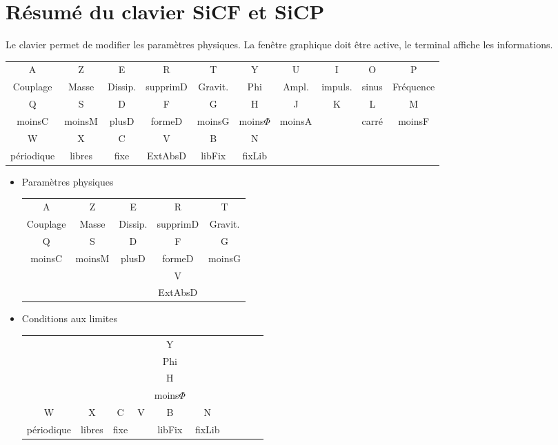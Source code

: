 %
\section{Résumé du clavier SiCF et SiCP}
%
Le clavier permet de modifier les paramètres physiques. La fenêtre graphique doit être active, le terminal affiche les informations.
%
%
\footnotesize
\begin{center}
\begin{tabular}{cccccccccc}
\sf A &\sf Z &\sf E &\sf R &\sf T &\sf Y &\sf U &\sf I &\sf O &\sf P \\
Couplage & Masse & Dissip. & supprimD & Gravit. & Phi & Ampl. & impuls. & sinus & Fréquence \\
\sf Q &\sf S &\sf D &\sf F &\sf G &\sf H &\sf J &\sf K &\sf L &\sf M \\
moinsC & moinsM & plusD & formeD & moinsG & moins$\Phi$ & moinsA &  & carré & moinsF \\
\sf W &\sf X &\sf C &\sf V &\sf B &\sf N &  &  &  & \\
périodique & libres & fixe & ExtAbsD & libFix & fixLib &  &  &  & \\
\end{tabular}
\end{center}
\vspace{.3cm}
%
\normalsize
\begin{itemize}[leftmargin=2cm, label=, itemsep=0pt]%
\item Paramètres physiques

\begin{tabular}{ccccc}
\sf A &\sf Z &\sf E &\sf R &\sf T  \\
Couplage & Masse & Dissip. & supprimD & Gravit.  \\
\sf Q &\sf S &\sf D &\sf F &\sf G  \\
moinsC & moinsM & plusD & formeD & moinsG  \\
 & & & \sf V   & \\
 & & & ExtAbsD &  \\
\end{tabular}
%
\end{itemize}
\begin{itemize}[leftmargin=2cm, label=, itemsep=0pt]%
\item Conditions aux limites

\hspace{3cm}
\begin{tabular}{cccccccccc}
 & & & &\sf Y \\
 & & & & Phi \\
 & & & &\sf H \\
 & & & & moins$\Phi$  & & &  & \\
\sf W &\sf X &\sf C &\sf V &\sf B &\sf N  \\
périodique & libres & fixe &  & libFix & fixLib  \\
\end{tabular}
%
\end{itemize}
